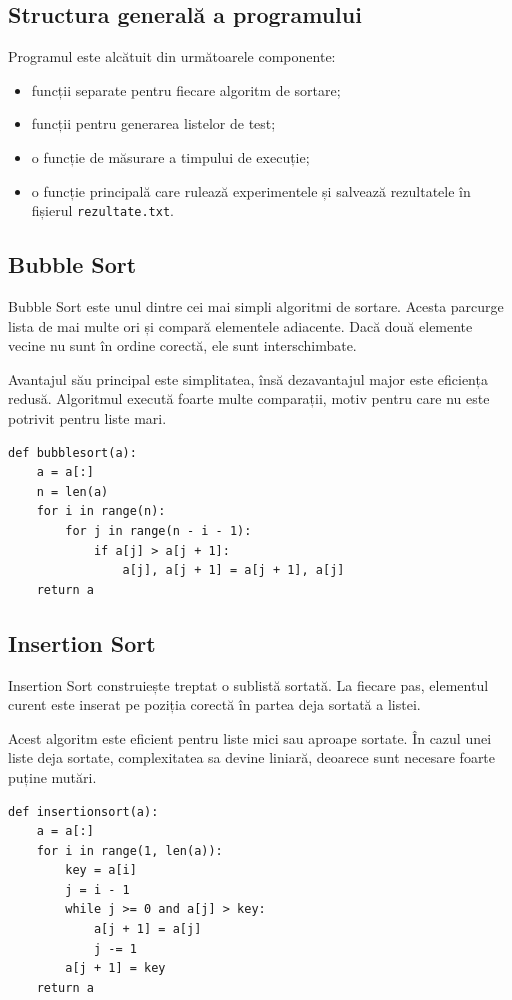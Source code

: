 \documentclass[a4paper,12pt]{article}
\begin{document}
\subsection{Structura generală a programului}
Programul este alcătuit din următoarele componente:
\begin{itemize}
    \item funcții separate pentru fiecare algoritm de sortare;
    \item funcții pentru generarea listelor de test;
    \item o funcție de măsurare a timpului de execuție;
    \item o funcție principală care rulează experimentele și salvează rezultatele în fișierul \texttt{rezultate.txt}.
\end{itemize}

\subsection{Bubble Sort}
Bubble Sort este unul dintre cei mai simpli algoritmi de sortare. Acesta parcurge lista de mai multe ori și compară elementele adiacente. Dacă două elemente vecine nu sunt în ordine corectă, ele sunt interschimbate.

Avantajul său principal este simplitatea, însă dezavantajul major este eficiența redusă. Algoritmul execută foarte multe comparații, motiv pentru care nu este potrivit pentru liste mari.

\begin{lstlisting}[style=mypython, caption={Implementarea Bubble Sort}]
def bubblesort(a):
    a = a[:]
    n = len(a)
    for i in range(n):
        for j in range(n - i - 1):
            if a[j] > a[j + 1]:
                a[j], a[j + 1] = a[j + 1], a[j]
    return a
\end{lstlisting}

\subsection{Insertion Sort}
Insertion Sort construiește treptat o sublistă sortată. La fiecare pas, elementul curent este inserat pe poziția corectă în partea deja sortată a listei.

Acest algoritm este eficient pentru liste mici sau aproape sortate. În cazul unei liste deja sortate, complexitatea sa devine liniară, deoarece sunt necesare foarte puține mutări.

\begin{lstlisting}[style=mypython, caption={Implementarea Insertion Sort}]
def insertionsort(a):
    a = a[:]
    for i in range(1, len(a)):
        key = a[i]
        j = i - 1
        while j >= 0 and a[j] > key:
            a[j + 1] = a[j]
            j -= 1
        a[j + 1] = key
    return a
\end{lstlisting}
\end{document}
